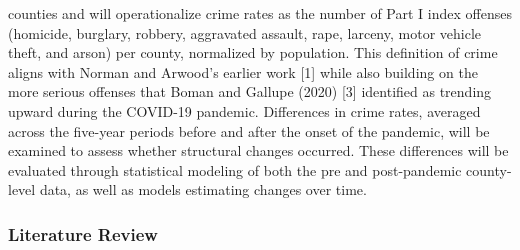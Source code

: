 \documentclass[
  11pt,
  letterpaper,
  DIV=11,
  numbers=noendperiod]{scrartcl}
\begin{document}
counties and will operationalize crime rates as the number of Part I
index offenses (homicide, burglary, robbery, aggravated assault, rape,
larceny, motor vehicle theft, and arson) per county, normalized by
population. This definition of crime aligns with Norman and Arwood's
earlier work {[}1{]} while also building on the more serious offenses
that Boman and Gallupe (2020) {[}3{]} identified as trending upward
during the COVID-19 pandemic. Differences in crime rates, averaged
across the five-year periods before and after the onset of the pandemic,
will be examined to assess whether structural changes occurred. These
differences will be evaluated through statistical modeling of both the
pre and post-pandemic county-level data, as well as models estimating
changes over time.

\subsubsection{Literature Review}\label{literature-review}
\end{document}
